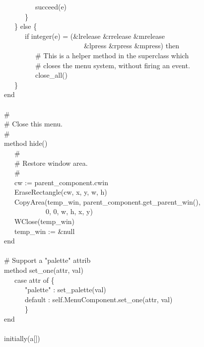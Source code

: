 {\>   \ \ \ \ \ \ \ \ \ succeed(e) \\
\>   \ \ \ \ \ \ \} \\
\>   \ \ \ \} else \{ \\
\>   \ \ \ \ \ \ if integer(e) = (\&lrelease {\textbar} \&rrelease
{\textbar} \&mrelease {\textbar} \\
\>   \ \ \ \ \ \ \ \ \ \ \ \ \ \ \ \ \ \ \ \ \ \ \ \&lpress {\textbar}
\&rpress {\textbar} \&mpress) then \\
\>   \ \ \ \ \ \ \ \ \ \# This is a helper method in the superclass
which \\
\>   \ \ \ \ \ \ \ \ \ \# closes the menu system, without firing an
event. \\
\>   \ \ \ \ \ \ \ \ \ close\_all() \\
\>   \ \ \ \} \\
\>   end \\
\ \\
\>   \# \\
\>   \# Close this menu. \\
\>   \# \\
\>   method hide() \\
\>   \ \ \ \# \\
\>   \ \ \ \# Restore window area. \\
\>   \ \ \ \# \\
\>   \ \ \ cw := parent\_component.cwin \\
\>   \ \ \ EraseRectangle(cw, x, y, w, h) \\
\>   \ \ \ CopyArea(temp\_win,
parent\_component.get\_parent\_win(), \\
\>   \ \ \ \ \ \ \ \ \ \ \ \ 0, 0, w, h, x, y) \\
\>   \ \ \ WClose(temp\_win) \\
\>   \ \ \ temp\_win := \&null \\
\>   end \\
\ \\
\>   \# Support a "palette" attrib \\
\>   method set\_one(attr, val) \\
\>   \ \ \ case attr of \{ \\
\>   \ \ \ \ \ \ "palette" :
set\_palette(val) \\
\>   \ \ \ \ \ \ default : self.MenuComponent.set\_one(attr, val) \\
\>   \ \ \ \ \ \ \} \\
\>   end \\
\ \\
\>   initially(a[]) \\
}
